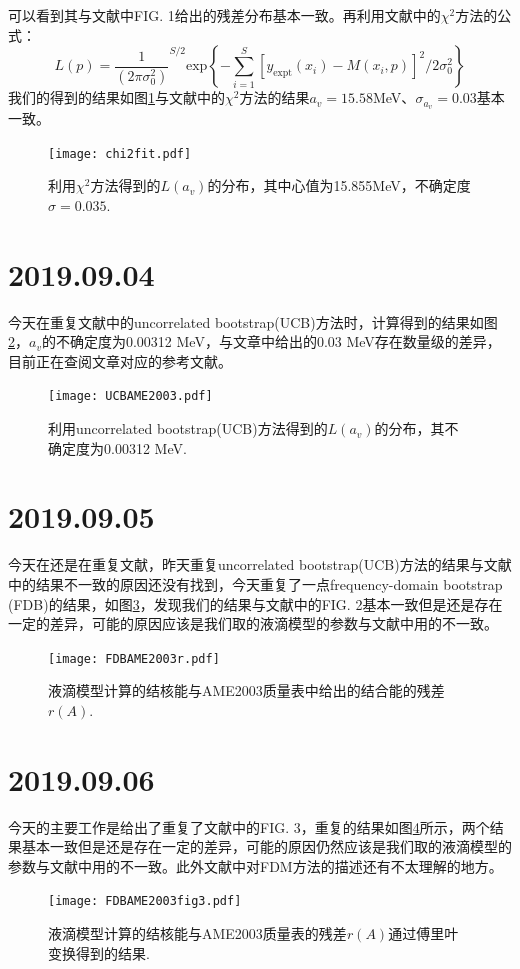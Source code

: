 可以看到其与文献\cite{RN569}中FIG. 1给出的残差分布基本一致。再利用文献\cite{RN569}中的$\chi^2$方法的公式：
\begin{equation}
	L(p)=\frac{1}{(2\pi\sigma_0^2)}^{S/2}\textrm{exp}\left\{-\sum^S_{i=1}[y_\textrm{expt}(x_i)-M(x_i,p)]^2/2\sigma^2_0\right\}
\end{equation}
我们的得到的结果如图\ref{fig_chi2fit}与文献\cite{RN569}中的$\chi^2$方法的结果$a_v=15.58$MeV、$\sigma_{a_v}=0.03$基本一致。
\begin{figure}[H]
\centering
\texttt{[image: chi2fit.pdf]}
\caption{利用$\chi^2$方法得到的$L(a_v)$的分布，其中心值为15.855MeV，不确定度$\sigma=0.035$.\label{fig_chi2fit}}
\end{figure}

\section{2019.09.04}
今天在重复文献\cite{RN569}中的uncorrelated bootstrap(UCB)方法时，计算得到的结果如图\ref{fig_UCBAME2003}，$a_v$的不确定度为0.00312 MeV，与文章中给出的0.03 MeV存在数量级的差异，目前正在查阅文章对应的参考文献\cite{RN570}。
\begin{figure}[H]
\centering
\texttt{[image: UCBAME2003.pdf]}
\caption{利用uncorrelated bootstrap(UCB)方法得到的$L(a_v)$的分布，其不确定度为0.00312 MeV.\label{fig_UCBAME2003}}
\end{figure}

\section{2019.09.05}
今天在还是在重复文献\cite{RN569}，昨天重复uncorrelated bootstrap(UCB)方法的结果与文献中的结果不一致的原因还没有找到，今天重复了一点frequency-domain bootstrap (FDB)的结果，如图\ref{fig_FDBAME2003r}，发现我们的结果与文献\cite{RN569}中的FIG. 2基本一致但是还是存在一定的差异，可能的原因应该是我们取的液滴模型的参数与文献\cite{RN569}中用的不一致。
\begin{figure}[H]
\centering
\texttt{[image: FDBAME2003r.pdf]}
\caption{液滴模型计算的结核能与AME2003质量表中给出的结合能的残差$r(A)$.\label{fig_FDBAME2003r}}
\end{figure}

\section{2019.09.06}
今天的主要工作是给出了重复了文献\cite{RN569}中的FIG. 3，重复的结果如图\ref{fig_FDBAME2003fig3}所示，两个结果基本一致但是还是存在一定的差异，可能的原因仍然应该是我们取的液滴模型的参数与文献\cite{RN569}中用的不一致。此外文献\cite{RN569}中对FDM方法的描述还有不太理解的地方。
\begin{figure}[H]
\centering
\texttt{[image: FDBAME2003fig3.pdf]}
\caption{液滴模型计算的结核能与AME2003质量表的残差$r(A)$通过傅里叶变换得到的结果.\label{fig_FDBAME2003fig3}}
\end{figure}

